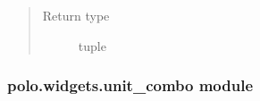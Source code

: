 \documentclass[letterpaper,10pt,english]{sphinxmanual}
\begin{document}
\begin{fulllineitems}
\begin{fulllineitems}
\begin{quote}
\begin{description}
\item[{Return type}] \leavevmode
tuple

\end{description}\end{quote}

\end{fulllineitems}


\end{fulllineitems}



\subsubsection{polo.widgets.unit\_combo module}
\label{\detokenize{polo.widgets:module-polo.widgets.unit_combo}}\label{\detokenize{polo.widgets:polo-widgets-unit-combo-module}}
\end{document}
